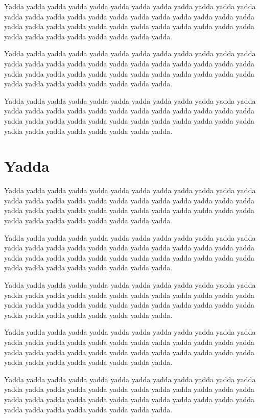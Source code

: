 \begin{multicols}{2}
\endgroup{}\endgroup{}Yadda yadda yadda yadda yadda yadda yadda yadda yadda yadda yadda
yadda yadda yadda yadda yadda yadda yadda yadda yadda yadda yadda
yadda yadda yadda yadda yadda yadda yadda yadda yadda yadda yadda
yadda yadda yadda yadda yadda yadda yadda yadda yadda yadda yadda.\mktsShowpar\par
Yadda yadda yadda yadda yadda yadda yadda yadda yadda yadda yadda
yadda yadda yadda yadda yadda yadda yadda yadda yadda yadda yadda
yadda yadda yadda yadda yadda yadda yadda yadda yadda yadda yadda
yadda yadda yadda yadda yadda yadda yadda yadda yadda yadda yadda.\mktsShowpar\par
Yadda yadda yadda yadda yadda yadda yadda yadda yadda yadda yadda
yadda yadda yadda yadda yadda yadda yadda yadda yadda yadda yadda
yadda yadda yadda yadda yadda yadda yadda yadda yadda yadda yadda
yadda yadda yadda yadda yadda yadda yadda yadda yadda yadda yadda.\mktsShowpar\par
\end{multicols}
\section{Yadda
}
\begin{multicols}{2}Yadda yadda yadda yadda yadda yadda yadda yadda yadda yadda yadda
yadda yadda yadda yadda yadda yadda yadda yadda yadda yadda yadda
yadda yadda yadda yadda yadda yadda yadda yadda yadda yadda yadda
yadda yadda yadda yadda yadda yadda yadda yadda yadda yadda yadda.\mktsShowpar\par
Yadda yadda yadda yadda yadda yadda yadda yadda yadda yadda yadda
yadda yadda yadda yadda yadda yadda yadda yadda yadda yadda yadda
yadda yadda yadda yadda yadda yadda yadda yadda yadda yadda yadda
yadda yadda yadda yadda yadda yadda yadda yadda yadda yadda yadda.\mktsShowpar\par
Yadda yadda yadda yadda yadda yadda yadda yadda yadda yadda yadda
yadda yadda yadda yadda yadda yadda yadda yadda yadda yadda yadda
yadda yadda yadda yadda yadda yadda yadda yadda yadda yadda yadda
yadda yadda yadda yadda yadda yadda yadda yadda yadda yadda yadda.\mktsShowpar\par
Yadda yadda yadda yadda yadda yadda yadda yadda yadda yadda yadda
yadda yadda yadda yadda yadda yadda yadda yadda yadda yadda yadda
yadda yadda yadda yadda yadda yadda yadda yadda yadda yadda yadda
yadda yadda yadda yadda yadda yadda yadda yadda yadda yadda yadda.\mktsShowpar\par
Yadda yadda yadda yadda yadda yadda yadda yadda yadda yadda yadda
yadda yadda yadda yadda yadda yadda yadda yadda yadda yadda yadda
yadda yadda yadda yadda yadda yadda yadda yadda yadda yadda yadda
yadda yadda yadda yadda yadda yadda yadda yadda yadda yadda yadda.\mktsShowpar\par
\end{multicols}
